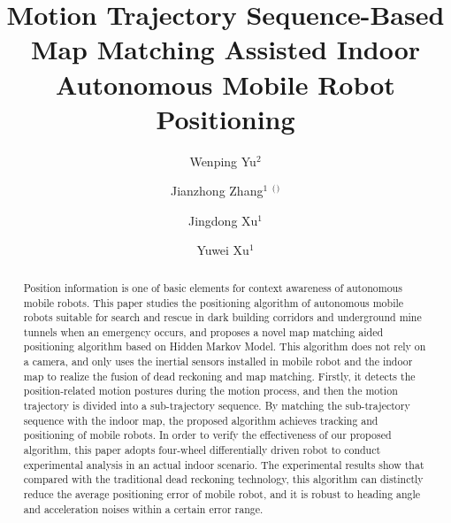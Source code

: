 \documentclass{llncs}
\begin{document}
%
\title{Motion Trajectory Sequence-Based Map Matching Assisted Indoor Autonomous Mobile Robot Positioning}
%

\author{Wenping Yu$^2$ \and Jianzhong Zhang$^1$ $^($\Envelope$^)$ \and Jingdong Xu$^1$ \and Yuwei Xu$^1$}
%
%
%


\maketitle              %

\begin{abstract}

Position information is one of basic elements for context awareness of autonomous mobile robots. This paper studies the positioning algorithm of autonomous mobile robots suitable for search and rescue in dark building corridors and underground mine tunnels when an emergency occurs, and proposes a novel map matching aided positioning algorithm based on Hidden Markov Model. This algorithm does not rely on a camera, and only uses the inertial sensors installed in mobile robot and the indoor map to realize the fusion of dead reckoning and map matching. Firstly, it detects the position-related motion postures during the motion process, and then the motion trajectory is divided into a sub-trajectory sequence. By matching the sub-trajectory sequence with the indoor map, the proposed algorithm achieves tracking and positioning of mobile robots. In order to verify the effectiveness of our proposed algorithm, this paper adopts four-wheel differentially driven robot to conduct experimental analysis in an actual indoor scenario. The experimental results show that compared with the traditional dead reckoning technology, this algorithm can distinctly reduce the average positioning error of mobile robot, and it is robust to heading angle and acceleration noises within a certain error range.

\end{abstract}
%
\end{document}
